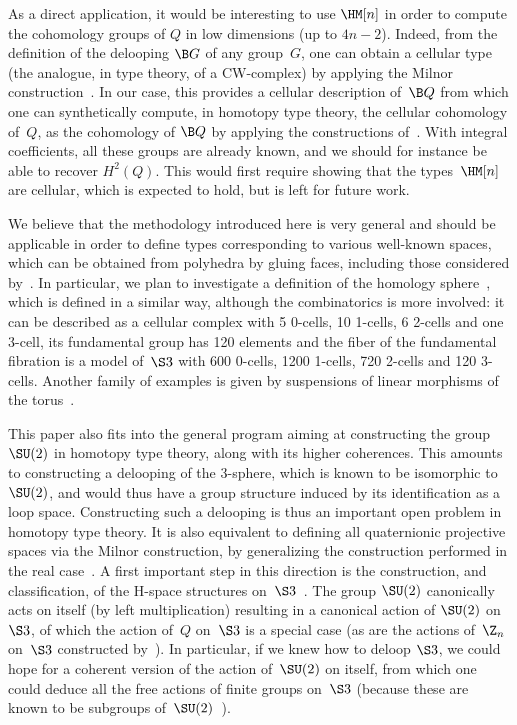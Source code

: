 \documentclass[a4paper]{article}
\newcommand{\citep}{\cite}
\begin{document}
As a direct application, it would be interesting to use $\HM[n]$ in order to compute the cohomology groups of $Q$ in low dimensions (up to $4n-2$). Indeed, from the definition of the delooping $\B G$ of any group~$G$, one can obtain a cellular type (the analogue, in type theory, of a CW-complex) by applying the Milnor construction~\citep{buchholtz2017real}. In our case, this provides a cellular description of~$\B Q$ from which one can synthetically compute, in homotopy type theory, the cellular cohomology of~$Q$, as the cohomology of $\B Q$ by applying the constructions of~\cite{buchholtz2020cellular}. With integral coefficients, all these groups are already known, and we should for instance be able to recover $H^2(Q)$. This would first require showing that the types~$\HM[n]$ are cellular, which is expected to hold, but is left for future work.

We believe that the methodology introduced here is very general and should be applicable in order to define types corresponding to various well-known spaces, which can be obtained from polyhedra by gluing faces, including those considered by~\cite{poincare1895analysis}. In particular, we plan to investigate a definition of the homology sphere~\citep{poincare1904cinquieme}, which is defined in a similar way, although the combinatorics is more involved: it can be described as a cellular complex with 5 0-cells, 10 1-cells, 6 2-cells and one 3-cell, its fundamental group has 120 elements and the fiber of the fundamental fibration is a model of~$\S3$ with 600 0-cells, 1200 1-cells, 720 2-cells and 120 3-cells. Another family of examples is given by suspensions of linear morphisms of the torus~\citep{arnold1967problemes}.

This paper also fits into the general program aiming at constructing the group $\SU(2)$ in homotopy type theory, along with its higher coherences. This amounts to constructing a delooping of the 3-sphere, which is known to be isomorphic to $\SU(2)$, and would thus have a group structure induced by its identification as a loop space. Constructing such a delooping is thus an important open problem in homotopy type theory. It is also equivalent to defining all quaternionic projective spaces via the Milnor construction, by generalizing the construction performed in the real case~\citep{buchholtz2017real}. A first important step in this direction is the construction, and classification, of the H-space structures on~$\S3$~\citep{buchholtz2016cayley,buchholtz2025central}. The group $\SU(2)$ canonically acts on itself (by left multiplication) resulting in a canonical action of $\SU(2)$ on~$\S3$, of which the action of~$Q$ on~$\S3$ is a special case (as are the actions of~$\Z_n$ on~$\S3$ constructed by~\cite{lens}). In particular, if we knew how to deloop $\S3$, we could hope for a coherent version of the action of~$\SU(2)$ on itself, from which one could deduce all the free actions of finite groups on~$\S3$ (because these are known to be subgroups of~$\SU(2)$~\citep{thurston2000three}).



% 


\end{document}
